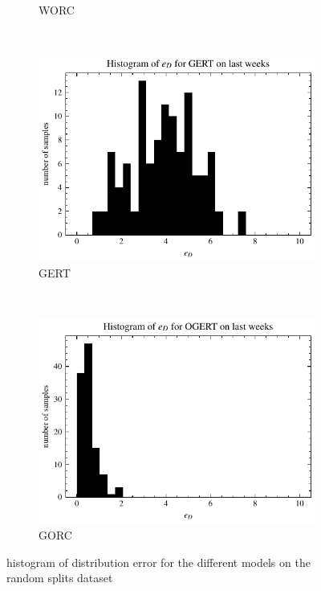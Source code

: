 \begin{figure}[ht]
\begin{subfigure}[t]{0.5\textwidth}
        \captionsetup{width=.9\linewidth}
        \caption{WORC}
    \end{subfigure}
    \\[1ex]
    \centering
    \begin{subfigure}[t]{0.5\textwidth}
        \centering
        \includegraphics[width=\textwidth]{chapters/figures/result_histograms/result_histogram_last_weeks_workload_dist_error_GERT.pdf}
        \captionsetup{width=.9\linewidth}
        \caption{GERT}
    \end{subfigure}%
    ~ 
    \begin{subfigure}[t]{0.5\textwidth}
        \centering
        \includegraphics[width=\textwidth]{chapters/figures/result_histograms/result_histogram_last_weeks_workload_dist_error_OGERT.pdf}
        \captionsetup{width=.9\linewidth}
        \caption{GORC}
    \end{subfigure}
    \caption{histogram of distribution error for the different models on the random splits dataset}
    \label{fig:result_last_weeks_dist}
\end{figure}
